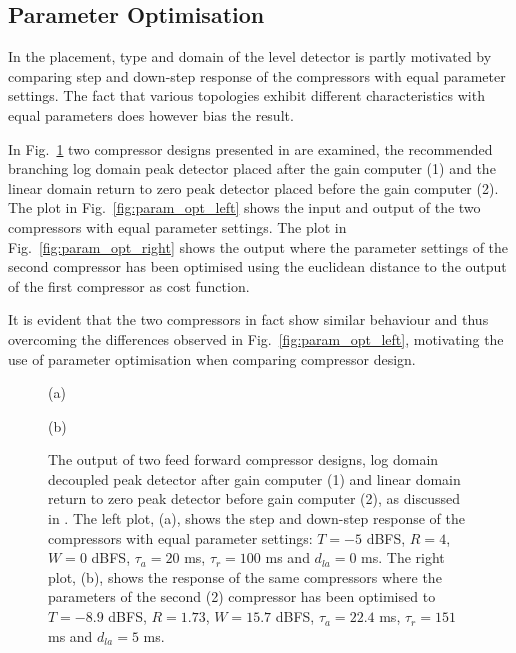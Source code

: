 \documentclass[../main2.tex]{subfiles}
\providecommand{\rootdir}{..}
\begin{document}
\subsection{Parameter Optimisation}\label{parameter_optimisation}
In \cite{reiss2012tutorial} the placement, type and domain of the level detector is partly motivated by comparing step and down-step response of the compressors with equal parameter settings. The fact that various topologies exhibit different characteristics with equal parameters does however bias the result. 

In Fig.~\ref{fig:param_opt} two compressor designs presented in \cite{reiss2012} are examined, the recommended branching log domain peak detector placed after the gain computer (1) and the linear domain return to zero peak detector placed before the gain computer (2). The plot in Fig.~\ref{fig:param_opt_left} shows the input and output of the two compressors with equal parameter settings. The plot in Fig.~\ref{fig:param_opt_right} shows the output where the parameter settings of the second compressor has been optimised using the euclidean distance to the output of the first compressor as cost function. 

It is evident that the two compressors in fact show similar behaviour and thus overcoming the differences observed in Fig.~\ref{fig:param_opt_left}, motivating the use of parameter optimisation when comparing compressor design.
\begin{figure}[ht]
\captionsetup*{justification=centering}
\begin{minipage}[t]{.5\textwidth}
 \centering

\caption*{(a)} 
\label{fig:param_opt_left}
\end{minipage}%
\begin{minipage}[t]{.5\textwidth}
\centering

\caption*{(b)} 
\label{fig:param_opt_right}
\end{minipage}
\caption{The output of two feed forward compressor designs, log domain decoupled peak detector after gain computer (1) and linear domain return to zero peak detector before gain computer (2), as discussed in \cite{reiss2012tutorial}. The left plot, (a), shows the step and down-step response of the compressors with equal parameter settings: $T = -5$ dBFS, $R=4$, $W=0$ dBFS, $\tau_a = 20$ ms, $\tau_r = 100$ ms and $d_{la}=0$ ms. The right plot, (b), shows the response of the same compressors where the parameters of the second (2) compressor has been optimised to $T = -8.9$ dBFS, $R=1.73$, $W=15.7$ dBFS, $\tau_a = 22.4$ ms, $\tau_r = 151$ ms and $d_{la}=5$ ms.}
\label{fig:param_opt}
\end{figure}
\end{document}
